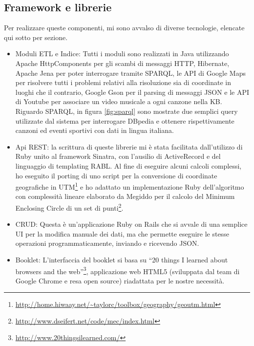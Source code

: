 \documentclass[sigproc-sp.tex]{subfiles}
\begin{document}
\subsection{Framework e librerie}
Per realizzare queste componenti, mi sono avvalso di diverse tecnologie, elencate qui sotto per sezione.
\begin{itemize}
\item Moduli ETL e Indice: Tutti i moduli sono realizzati in Java utilizzando Apache HttpComponents per gli scambi di messaggi HTTP, Hibernate, Apache Jena per poter interrogare tramite SPARQL, le API di Google Maps per risolvere tutti i problemi relativi alla risoluzione sia di coordinate in luoghi che il contrario, Google Gson per il parsing di messaggi JSON e le API di Youtube per associare un video musicale a ogni canzone nella KB. Riguardo SPARQL, in figura \ref{fig:sparql} sono mostrate due semplici query utilizzate dal sistema per interrogare DBpedia e ottenere rispettivamente canzoni ed eventi sportivi con dati in lingua italiana.
\item Api REST: la scrittura di queste librerie mi è stata facilitata dall’utilizzo di Ruby unito al framework Sinatra, con l’ausilio di ActiveRecord e del linguaggio di templating RABL. Al fine di eseguire alcuni calcoli complessi, ho eseguito il porting di uno script per la conversione di coordinate geografiche in UTM\footnote{\url{http://home.hiwaay.net/~taylorc/toolbox/geography/geoutm.html}} e ho adattato un implementazione Ruby dell’algoritmo con complessità lineare elaborato da Megiddo per il calcolo del Minimum Enclosing Circle di un set di punti\footnote{\url{http://www.dseifert.net/code/mec/index.html}}.
\item CRUD: Questa è un’applicazione Ruby on Rails che si avvale di una semplice UI per la modifica manuale dei dati, ma che permette eseguire le stesse operazioni programmaticamente, inviando e ricevendo JSON.
\item Booklet: L’interfaccia del booklet si basa su “20 things I learned about browsers and the web”\footnote{\url{http://www.20thingsilearned.com/}}, applicazione web HTML5 (sviluppata dal team di Google Chrome e resa open source) riadattata per le nostre necessità.
\end{itemize}
\end{document}

